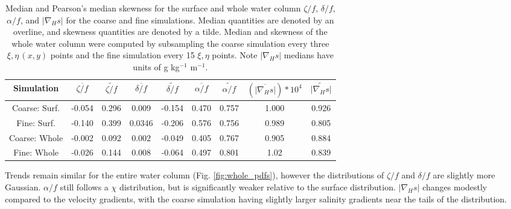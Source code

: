  \begin{table}[h]
    \caption{Median and Pearson's median skewness for the surface and whole water column $\zeta/f$, $\delta/f$, $\alpha/f$, and $|\nabla_H s|$ for the coarse and fine simulations. Median quantities are denoted by an overline, and skewness quantities are denoted by a tilde. Median and skewness of the whole water column were computed by subsampling the coarse simulation every three $\xi, \eta \, (x,y)$ points and the fine simulation every 15 $\xi, \eta$ points. Note $|\nabla_H s|$ medians have units of g kg$^{-1}$ m$^{-1}$.}
    \centering
        \begin{tabular}{c c c c c c c c c}
        \hline
         Simulation & $\overline{\zeta/f}$ & $\widetilde{\zeta/f}$  & $\overline{\delta/f}$ &
         $\widetilde{\delta/f}$ &
         $\overline{\alpha/f}$  &
         $\widetilde{\alpha/f}$ & 
         $(\overline{|\nabla_H s|})*10^4$  &
         $\widetilde{|\nabla_H s|}$ \\
        \hline
         Coarse: Surf. & -0.054 & 0.296 & 0.009 & -0.154 & 0.470 & 0.757 & 1.000 & 0.926 \\
         Fine: Surf. & -0.140 & 0.399 & 0.0346 & -0.206 & 0.576 & 0.756 & 0.989 & 0.805 \\
         Coarse: Whole & -0.002 & 0.092 & 0.002 & -0.049 & 0.405 & 0.767 & 0.905 & 0.884 \\
         Fine: Whole &  -0.026 & 0.144 & 0.008 & -0.064 & 0.497 & 0.801 & 1.02 & 0.839 \\
        \hline
         \end{tabular} 
         \label{tab:1}
 \end{table}
 
Trends remain similar for the entire water column (Fig. \ref{fig:whole_pdfs}), however the distributions of $\zeta/f$ and $\delta/f$ are slightly more Gaussian. $\alpha/f$ still follows a $\chi$ distribution, but is significantly weaker relative to the surface distribution.  $|\nabla_H s|$ changes modestly compared to the velocity gradients, with the coarse simulation having slightly larger salinity gradients near the tails of the distribution. 

